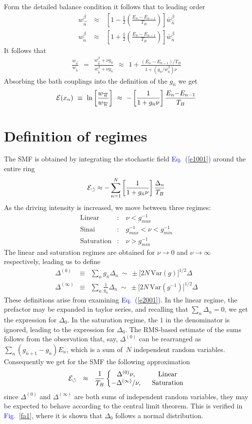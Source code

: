 \documentclass[aps,prl,floats,floatfix,twocolumn]{revtex4}
\newcommand{\amatrix}[1]{\begin{matrix} #1 \end{matrix}}
\newcommand{\mylabel}[1]{\label{#1}}
\newcommand{\beq}{\begin{eqnarray}}
\newcommand{\eeq}{\end{eqnarray}}
\newcommand{\be}[1]{\begin{eqnarray}\ifthenelse{#1=-1}
{\nonumber}{\ifthenelse{#1=0}{}{\mylabel{e#1}}}}
\newcommand{\ee}{\end{eqnarray}}
\newcommand{\Eq}[1]{\textcolor{blue}{Eq.\!\!~(\ref{#1})}}
\newcommand{\Fig}[1]{\textcolor{blue}{Fig.}\!\!~\ref{#1}}
\begin{document}
Form the detailed balance condition it follows that 
to leading order 
%
\beq
w^{\beta}_{\overrightarrow{n}} \ &\approx& \ \left[1-\frac{1}{2}\left(\frac{E_n-E_{n{-}1}}{T_B}\right)\right]\bar{w}_{\bar{n}}^{\beta} \\ 
w^{\beta}_{\overleftarrow{n}} \ &\approx& \ \left[1+\frac{1}{2}\left(\frac{E_n-E_{n{-}1}}{T_B}\right)\right]\bar{w}_{\bar{n}}^{\beta}
\eeq  
%
It follows that 
%
\beq
\frac{w_{\overrightarrow{n}}}{w_{\overleftarrow{n}}} 
\ \ = \ \ \frac{w^{\beta}_{\overrightarrow{n}}+\nu g_{\bar{n}}}{w^{\beta}_{\overleftarrow{n}}+\nu g_{\bar{n}}}
\ \ \approx \ \ 1+ \frac{(E_n-E_{n{-}1})/T_B}{1+(g_{\bar{n}}/\bar{w}_{\bar{n}}^{\beta})\nu}
\eeq
%
Absorbing the bath couplings into the definition of the $g_{\bar{n}}$ we get  
%
\be{1001}
\mathcal{E}(x_n) \ \equiv \ \ln \left[\frac{w_{\overrightarrow{n}}}{w_{\overleftarrow{n}}}\right] 
\ \approx \ - \left[ \frac{1}{1+g_{\bar{n}}\nu} \right] \frac{E_n{-}E_{n{-}1}}{T_B}
\ee

\section{Definition of regimes}

The SMF is obtained by integrating the stochastic field  \Eq{e1001} around the entire ring 
%
\be{2001}
\mathcal{E}_{\circlearrowleft} 
\approx  -\sum_{n=1}^N \left[ \frac{1}{1+g_{\bar{n}}\nu} \right] \frac{\Delta_n}{T_B}
\eeq
%
As the driving intensity is increased, we move between three regimes: 
% 
\beq
\text{Linear}&:& \ \nu < g_{max}^{-1} \\
\text{Sinai}&:&  \ g_{max}^{-1} < \nu < g_{min}^{-1}\\
\text{Saturation}&:& \ \nu > g_{min}^{-1}
\eeq
%
The linear and saturation regimes are obtained for $\nu \rightarrow 0$ and $\nu \rightarrow \infty$ respectively, leading us to define 
%
\beq
\Delta^{(0)} &\equiv&  \sum_{n} g_{\bar{n}}  \Delta_n 
\ \sim \ \pm \Big[2N \, \mbox{Var}(g)\Big]^{1/2} \Delta
\\
\Delta^{(\infty)} &\equiv& \sum_{n} \frac{1}{g_{\bar{n}}}  \Delta_n
\ \sim \ \pm \Big[2N \, \mbox{Var}(g^{-1})\Big]^{1/2} \Delta
\eeq
%
These definitions arise from examining \Eq{e2001}.
In the linear regime, the prefactor  may be expanded in taylor series, and recalling that 
${\sum_n\Delta_n=0}$, we get the expression for $\Delta_0$. 
In the saturation regime, the $1$ in the denominator is ignored, leading to the expression for $\Delta_0$.
%
The RMS-based estimate of the sums follows from the observation 
that, say, $\Delta^{(0)}$ can be rearranged as 
${\sum_n (g_{\bar{n}+1}-g_{\bar{n}}) E_n}$, 
which is a sum of~$N$ independent random variables.  
Consequently we get for the SMF the following approximation 
%
\be{131}
\mathcal{E}_{\circlearrowleft} \ \ \approx \ \ 
\frac{1}{T_B}
\left\{
\amatrix{
\Delta^{(0)}\nu, & \ \ \text{Linear} \cr 
-\Delta^{(\infty)}/\nu , & \ \ \text{Saturation}
}\right.
\eeq
%
since  $\Delta^{(0)} $ and $\Delta^{(\infty)} $ 
are both sums of independent random variables,
they may be expected to behave according to the central limit theorem.
This is verified in \Fig{fa1}, 
where it is shown that  $\Delta_0$ follows a normal distribution.
\end{document}
